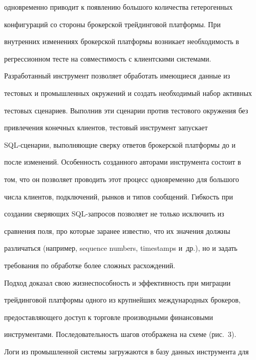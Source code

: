 одновременно приводит к появлению большого количества гетерогенных


конфигураций со стороны брокерской трейдинговой платформы. При


внутренних изменениях брокерской платформы возникает необходимость в


регрессионном тесте на совместимость с клиентскими системами.





Разработанный инструмент позволяет обработать имеющиеся данные из


тес\-то\-вых и промышленных окружений и создать необходимый набор активных


тестовых сценариев. Выполнив эти сценарии против тестового окружения без


привлечения конечных клиентов, тестовый инструмент запускает


SQL-сце\-на\-рии, выполняющие сверку ответов брокерской платформы до и


после изменений. Особенность созданного авторами инструмента состоит в


том, что он позволяет проводить этот процесс одновременно для большого


числа клиентов, подключений, рынков и типов сообщений. Гибкость при


создании сверяющих SQL-за\-про\-сов позволяет не только исключить из


сравнения поля, про которые заранее известно, что их значения должны


различаться (например, sequence numbers, timestamps и~др.), но и задать


требования по обработке более сложных расхождений.





Подход доказал свою жизнеспособность и эффективность при миграции


трейдинговой платформы одного из крупнейших международных брокеров,


предо\-став\-ля\-юще\-го доступ к торговле производными финансовыми


инструментами. Последовательность шагов отображена на схеме (рис.~3).











Логи из промышленной системы загружаются в базу данных инструмента для


